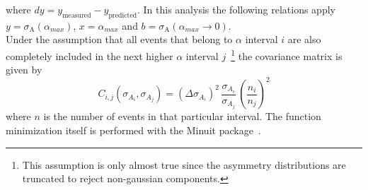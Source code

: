 where $dy = y_{\mathrm{measured}} - y_{\mathrm{predicted}}$. In this analysis the following relations apply $y=\sigma_\mathrm{A}(\alpha_{max})$, $x=\alpha_{max}$ and $b=\sigma_\mathrm{A}(\alpha_{max} \rightarrow 0)$. \\
Under the assumption that all events that belong to $\alpha$ interval $i$ are also completely included in the next higher $\alpha$ interval $j$~\footnote{This assumption is only almost true since the asymmetry distributions are truncated to reject non-gaussian components.} the covariance matrix is given by
\begin{equation}
C_{i,j}(\sigma_{A_i},\sigma_{A_j}) = (\Delta \sigma_{A_i})^2 \, \frac{\sigma_{A_i}}{\sigma_{A_j}} \, (\frac{n_i}{n_j})^2 
\end{equation}
where $n$ is the number of events in that particular interval. The function minimization itself is performed with the Minuit package~\cite{Minuit}. 

